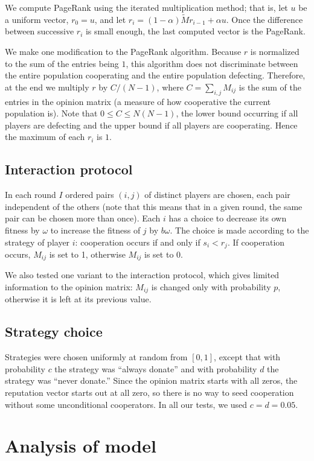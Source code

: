 \documentclass{amsart}
\begin{document}
We compute PageRank using the iterated multiplication method; that is,
let $u$ be a uniform vector, $r_0 = u$, and let $r_i =
(1-\alpha)\tilde M r_{i-1} + \alpha u$. Once the difference between
successive $r_i$ is small enough, the last computed vector is the
PageRank.

We make one modification to the PageRank algorithm. Because $r$ is
normalized to the sum of the entries being $1$, this algorithm does
not discriminate between the entire population cooperating and the
entire population defecting. Therefore, at the end we multiply $r$ by
$C/(N-1)$, where $C = \sum_{i,j} M_{ij}$ is the sum of the entries in
the opinion matrix (a measure of how cooperative the current
population is). Note that $0 \le C \le N(N-1)$, the lower bound
occurring if all players are defecting and the upper bound if all
players are cooperating. Hence the maximum of each $r_i$ is $1$.

\subsection{Interaction protocol}
In each round $I$ ordered pairs $(i,j)$ of distinct players are
chosen, each pair independent of the others (note that this means that
in a given round, the same pair can be chosen more than once). Each
$i$ has a choice to decrease its own fitness by $\omega$ to increase
the fitness of $j$ by $b \omega$. The choice is made according to the
strategy of player $i$: cooperation occurs if and only if $s_i <
r_j$. If cooperation occurs, $M_{ij}$ is set to 1, otherwise
$M_{ij}$ is set to $0$.

We also tested one variant to the interaction protocol, which gives
limited information to the opinion matrix: $M_{ij}$ is changed only
with probability $p$, otherwise it is left at its previous value.

\subsection{Strategy choice}
Strategies were chosen uniformly at random from $[0,1]$, except that
with probability $c$ the strategy was ``always donate'' and with
probability $d$ the strategy was ``never donate.'' Since the opinion
matrix starts with all zeros, the reputation vector starts out at all
zero, so there is no way to seed cooperation without some
unconditional cooperators. In all our tests, we used $c=d=0.05$.

\section{Analysis of model}
\label{sec:analysis}
\end{document}
